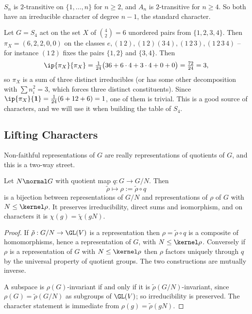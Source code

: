 \begin{example}[$S_n$ and $A_n$]
	$S_n$ is $2$-transitive on $\{1,\dots,n\}$ for $n \geq 2$, and $A_n$ is $2$-transitive for $n \geq 4$. So both have an irreducible character of degree $n-1$, the standard character.
\end{example}

\begin{example}
	Let $G = S_4$ act on the set $X$ of $\binom42 = 6$ unordered pairs from $\{1,2,3,4\}$. Then $\pi_X = (6, 2, 2, 0, 0)$ on the classes $e, (1\,2), (1\,2)(3\,4), (1\,2\,3), (1\,2\,3\,4)$ -- for instance $(1\,2)$ fixes the pairs $\{1,2\}$ and $\{3,4\}$. Then
	$$\ip{\pi_X}{\pi_X} = \tfrac1{24}\big(36 + 6\cdot 4 + 3\cdot 4 + 0 + 0\big) = \tfrac{72}{24} = 3,$$
	so $\pi_X$ is a sum of three distinct irreducibles (or has some other decomposition with $\sum n_i^2 = 3$, which forces three distinct constituents). Since $\ip{\pi_X}{\mathbf 1} = \frac1{24}(6 + 12 + 6) = 1$, one of them is trivial. This is a good source of characters, and we will use it when building the table of $S_4$.
\end{example}

\subsection{Lifting Characters}

Non-faithful representations of $G$ are really representations of quotients of $G$, and this is a two-way street.

\begin{proposition}[Lifting]
	Let $N \normal G$ with quotient map $q : G \to G/N$. Then
	$$\tilde\rho \longmapsto \rho := \tilde\rho \circ q$$
	is a bijection between representations of $G/N$ and representations of $\rho$ of $G$ with $N \leq \kernel\rho$. It preserves irreducibility, direct sums and isomorphism, and on characters it is $\chi(g) = \tilde\chi(gN)$.
\end{proposition}
\begin{proof}
	If $\tilde\rho : G/N \to \GL(V)$ is a representation then $\rho = \tilde\rho\circ q$ is a composite of homomorphisms, hence a representation of $G$, with $N \leq \kernel \rho$. Conversely if $\rho$ is a representation of $G$ with $N \leq \kernel\rho$ then $\rho$ factors uniquely through $q$ by the universal property of quotient groups. The two constructions are mutually inverse.

	A subspace is $\rho(G)$-invariant if and only if it is $\tilde\rho(G/N)$-invariant, since $\rho(G) = \tilde\rho(G/N)$ as subgroups of $\GL(V)$; so irreducibility is preserved. The character statement is immediate from $\rho(g) = \tilde\rho(gN)$.
\end{proof}


